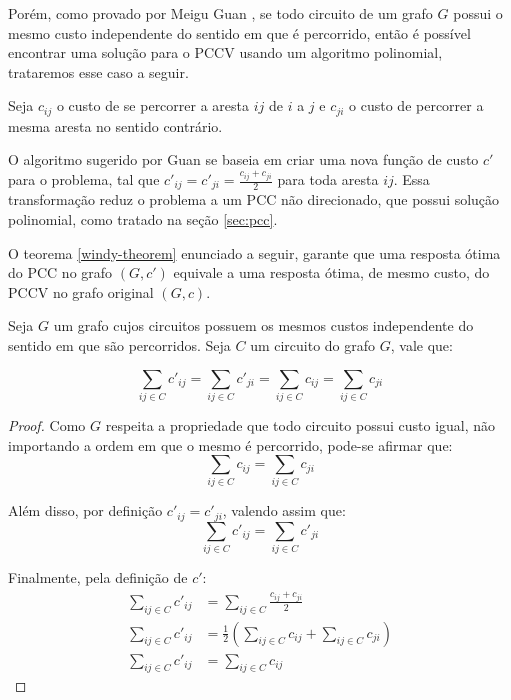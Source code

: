         Porém, como provado por Meigu Guan \cite{guan-windy}, se todo circuito de um grafo $G$ possui o mesmo custo independente do sentido em que é percorrido, então é possível encontrar uma solução para o PCCV usando um algoritmo polinomial, trataremos esse caso a seguir.

        Seja $c_{ij}$ o custo de se percorrer a aresta $ij$ de $i$ a $j$ e $c_{ji}$ o custo de percorrer a mesma aresta no sentido contrário.

        O algoritmo sugerido por Guan se baseia em criar uma nova função de custo $c'$ para o problema, tal que $c'_{ij} = c'_{ji} = \frac{c_{ij} + c_{ji}}{2}$ para toda aresta $ij$. 
        Essa transformação reduz o problema a um PCC não direcionado, que possui solução polinomial, como tratado na seção \ref{sec:pcc}.

        O teorema \ref{windy-theorem} enunciado a seguir, garante que uma resposta ótima do PCC no grafo $(G, c')$ equivale a uma resposta ótima, de mesmo custo, do PCCV no grafo original $(G, c)$.

        \begin{lemma}
            \label{lemma:pccv}
            Seja $G$ um grafo cujos circuitos possuem os mesmos custos independente do sentido em que são percorridos.
            Seja $C$ um circuito do grafo $G$, vale que:

            \[
                \sum_{ij \in C} c'_{ij} = \sum_{ij \in C} c'_{ji} =  \sum_{ij \in C} c_{ij} =  \sum_{ij \in C} c_{ji}
            \]
        \end{lemma}
        \begin{proof}
            Como $G$ respeita a propriedade que todo circuito possui custo igual, não importando a ordem em que o mesmo é percorrido, pode-se afirmar que:
            \[
                \sum_{ij \in C} c_{ij} =  \sum_{ij \in C} c_{ji}
            \]

            Além disso, por definição $c'_{ij} = c'_{ji}$, valendo assim que:
            \[
                \sum_{ij \in C} c'_{ij} = \sum_{ij \in C} c'_{ji} 
            \]

            Finalmente, pela definição de $c'$: 
            \begin{align*}
                \sum_{ij \in C} c'_{ij} &= \sum_{ij \in C} \frac{c_{ij} + c_{ji}}{2} \\
                \sum_{ij \in C} c'_{ij} &= \frac{1}{2} \left(\sum_{ij \in C}c_{ij} + \sum_{ij \in C}c_{ji} \right) \\
                \sum_{ij \in C} c'_{ij} &= \sum_{ij \in C} c_{ij}
            \end{align*}

        \end{proof}


